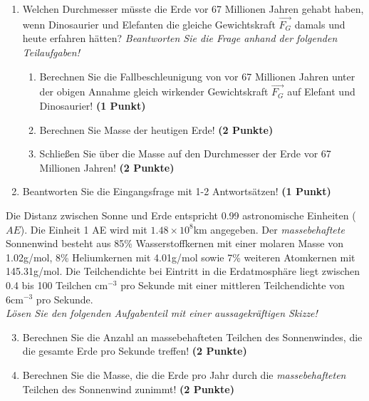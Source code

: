 \documentclass[a4paper, 9pt]{scrartcl}\usepackage[]{graphicx}\usepackage[]{xcolor}
\begin{document}
\begin{enumerate}
\item Welchen Durchmesser müsste die Erde vor 67 Millionen Jahren gehabt haben, wenn Dinosaurier und Elefanten die gleiche Gewichtskraft $\overrightarrow{F_G}$ damals und heute erfahren hätten? \textit{Beantworten Sie die Frage anhand der folgenden Teilaufgaben!}
\begin{enumerate}
\item Berechnen Sie die Fallbeschleunigung von vor 67 Millionen Jahren unter der obigen Annahme gleich wirkender Gewichtskraft $\overrightarrow{F_G}$ auf Elefant und Dinosaurier! \textbf{(1 Punkt)}
\item Berechnen Sie Masse der heutigen Erde! \textbf{(2 Punkte)}
\item Schließen Sie über die Masse auf den Durchmesser der Erde vor 67 Millionen Jahren! \textbf{(2 Punkte)}
\end{enumerate}
\item Beantworten Sie die Eingangsfrage mit 1-2 Antwortsätzen! \textbf{(1 Punkt)}
\end{enumerate}

Die Distanz zwischen Sonne und Erde entspricht 0.99 astronomische Einheiten ($AE$). Die Einheit 1 AE wird mit \ensuremath{1.48\times 10^{8}}km angegeben. Der \textit{massebehaftete} Sonnenwind besteht aus 85\% Wasserstoffkernen mit einer molaren Masse von 1.02g/mol, 8\% Heliumkernen mit 4.01g/mol sowie 7\% weiteren Atomkernen mit  145.31g/mol. Die Teilchendichte bei Eintritt in die Erdatmosphäre liegt zwischen 0.4 bis 100 Teilchen cm$^{-3}$ pro Sekunde mit einer mittleren Teilchendichte von 6cm$^{-3}$ pro Sekunde. \\

\textit{Lösen Sie den folgenden Aufgabenteil mit einer aussagekräftigen Skizze!}

\begin{enumerate}
  \setcounter{enumi}{2}
\item Berechnen Sie die Anzahl an massebehafteten Teilchen des Sonnenwindes, die die gesamte Erde pro Sekunde treffen! \textbf{(2 Punkte)}
\item Berechnen Sie die Masse, die die Erde pro Jahr durch die \textit{massebehafteten} Teilchen des Sonnenwind zunimmt! \textbf{(2 Punkte)}
\end{enumerate}
\end{document}
